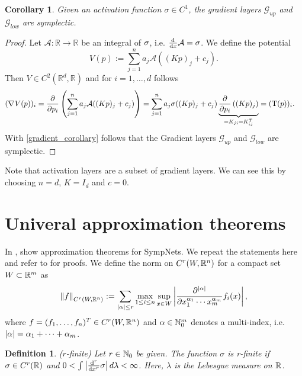 \documentclass[twoside,a4paper]{article}
\newtheorem{definition}{Definition}
\newtheorem{corollary}{Corollary}
\begin{document}
\begin{corollary}
	Given an activation function $\sigma \in C^1$, the gradient layers $\mathcal{G}_{up}$
	and $\mathcal{G}_{low}$ are symplectic.
\end{corollary}
\begin{proof}
	Let $\mathcal{A}: \mathbb{R} \to \mathbb{R}$ be an integral of $\sigma$, 
	i.e. $\frac{\mathrm{d}^{}}{\mathrm{d}x} \mathcal{A} = \sigma$. We define the potential
	\begin{equation*}
		V(p) := \sum_{j=1}^n a_j \mathcal{A}((Kp)_j + c_j)
		.
	\end{equation*}
	Then $V \in C^2(\mathbb{R}^d, \mathbb{R})$ and for $i=1, \dots, d$ follows
	\begin{align*}
		(\nabla_{}{V(p)})_i &= \frac{\partial }{\partial p_i} \left( \sum_{j=1}^n a_j \mathcal{A}((Kp)_j + c_j) \right)
		= \sum_{j=1}^n a_j \sigma((Kp)_j + c_j) 
		\underbrace{\frac{\partial }{\partial p_i} \left( (Kp)_j \right)}_{=K_{ji} = K^T_{ij}}
		= (\mathrm{T}(p))_i
		.
	\end{align*}
	With \cref{gradient_corollary} follows that the Gradient layers
	$\mathcal{G}_{up}$ and $\mathcal{G}_{low}$ are symplectic.
\end{proof}

Note that activation layers are a subset of gradient layers. We can see this by choosing
$n=d$, $K=I_d$ and $c=0$.

\section{Univeral approximation theorems}\label{sec_unv_approx_theorem}

In \cite{Jin2020}, \citeauthor{Jin2020} show approximation theorems for SympNets.
We repeat the statements here and refer to \cite{Jin2020} for proofs.
We define the norm on $C^r(W, \mathbb{R}^n)$ for a compact set $W \subset \mathbb{R}^m$ as
\begin{equation*}
	\left\lVert{f}\right\rVert_{C^r(W,\mathbb{R}^n)} := \sum_{\left|{\alpha}\right| \leq r}
	\max_{1 \leq i \leq n} \sup_{x \in W}
	\left|{\frac{\partial^{\left|{\alpha}\right|}}{\partial x_1^{\alpha_1} \cdots x_m^{\alpha_m}} 
	f_i(x)}\right|
	,
\end{equation*}
where $f = (f_1, \dots, f_n)^T \in C^r(W,\mathbb{R}^n)$ and $\alpha \in \mathbb{N}_0^m$ denotes a multi-index, i.e. 
$\left|{\alpha}\right| = \alpha_1 + \cdots + \alpha_m$.

\begin{definition}
	($r$-finite)
	Let $r \in \mathbb{N}_0$ be given. The function $\sigma$ is r-finite if $\sigma \in C^r(\mathbb{R})$
	and $0 < \int \left|{\frac{\mathrm{d}^r}{\mathrm{d}x^r} \sigma}\right| d\lambda < \infty$. Here,
	$\lambda$ is the Lebesgue measure on $\mathbb{R}$.
\end{definition}
\end{document}
